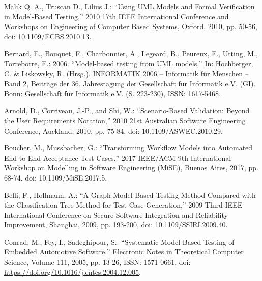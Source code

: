 \documentclass[a4paper,10pt, bibliography=totocnumbered]{scrreprt}
\begin{document}
\begin{thebibliography}{9}
 Malik Q. A., Truscan D., Lilius J.: \enquote{Using UML Models and Formal Verification in Model-Based Testing,} 2010 17th IEEE International Conference and Workshops on Engineering of Computer Based Systems, Oxford, 2010, pp. 50-56, doi: 10.1109/ECBS.2010.13.

 Bernard, E., Bouquet, F., Charbonnier, A., Legeard, B., Peureux, F., Utting, M., Torreborre, E.: 2006. \enquote{Model-based testing from UML models,} In: Hochberger, C. \& Liskowsky, R. (Hrsg.), INFORMATIK 2006 – Informatik für Menschen – Band 2, Beiträge der 36. Jahrestagung der Gesellschaft für Informatik e.V. (GI). Bonn: Gesellschaft für Informatik e.V. (S. 223-230),  ISSN: 1617-5468.





 Arnold, D., Corriveau, J.-P., and Shi, W.: \enquote{Scenario-Based Validation: Beyond the User Requirements Notation,} 2010 21st Australian Software Engineering Conference, Auckland, 2010, pp. 75-84, doi: 10.1109/ASWEC.2010.29.

 Boucher, M., Mussbacher, G.: \enquote{Transforming Workflow Models into Automated End-to-End Acceptance Test Cases,} 2017 IEEE/ACM 9th International Workshop on Modelling in Software Engineering (MiSE), Buenos Aires, 2017, pp. 68-74, doi: 10.1109/MiSE.2017.5.



Belli, F., Hollmann, A.: \enquote{A Graph-Model-Based Testing Method Compared with the Classification Tree Method for Test Case Generation,} 2009 Third IEEE International Conference on Secure Software Integration and Reliability Improvement, Shanghai, 2009, pp. 193-200, doi: 10.1109/SSIRI.2009.40.

Conrad, M., Fey, I., Sadeghipour, S.: \enquote{Systematic Model-Based Testing of Embedded
Automotive Software,} Electronic Notes in Theoretical Computer Science, Volume 111, 2005, pp. 13-26, ISSN: 1571-0661, doi: \url{https://doi.org/10.1016/j.entcs.2004.12.005}.


\end{thebibliography}

\listoffigures

\listoftables
\end{document}
